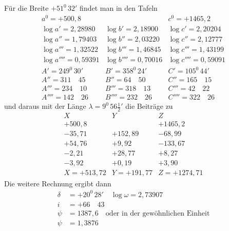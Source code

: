 Für die Breite $+51^0\,32'$ findet man in den Tafeln
\[
\begin{array}{r|r|r}
a^0=+500{,}8&&c^0=+1465{,}2\\
\log a'=2{,}28980&\log b'=2{,}18900&\log c'=2{,}20204\\
\log a''=1{,}79403&\log b''=2{,}03220&\log c''=2{,}12777\\
\log a'''=1{,}32522&\log b'''=1{,}46845&\log c'''=1{,}43199\\
\log a''''=0{,}59391&\log b''''=0{,}70016&\log c''''=0{,}59091\\
A'=249^0\,30'&B'=358^0\,24'&C'=105^0\,44'\\
A''=311\quad45&B''=64\quad50&C''=165\quad15\\
A'''=234\quad10&B'''=318\quad13&C'''=42\quad22\\
A''''=142\quad26&B''''=232\quad26&C''''=322\quad26
\end{array}
\]
und daraus mit der Länge $\lambda=9^0\,56\frac12'$ die Beiträge zu
\[
\begin{array}{r|r|r}
X&Y&Z\\\hline
+500{,}8&&+1465{,}2\\
-35{,}71&+152{,}89&-68{,}99\\
+54{,}76&+9{,}92&-133{,}67\\
-2{,}21&+28{,}77&+8{,}27\\
-3{,}92&+0{,}19&+3{,}90\\\hline
X=+513{,}72&Y=+191{,}77&Z=+1274{,}71
\end{array}
\]
Die weitere Rechnung ergibt dann
\[
\begin{aligned}
\delta&=+20^0\,28'\quad\log\omega=2{,}73907\\
i&=+66\quad43\\
\psi&=1387{,}6\quad\text{oder in der gewöhnlichen Einheit}\\
\psi&=1{,}3876
\end{aligned}
\]

